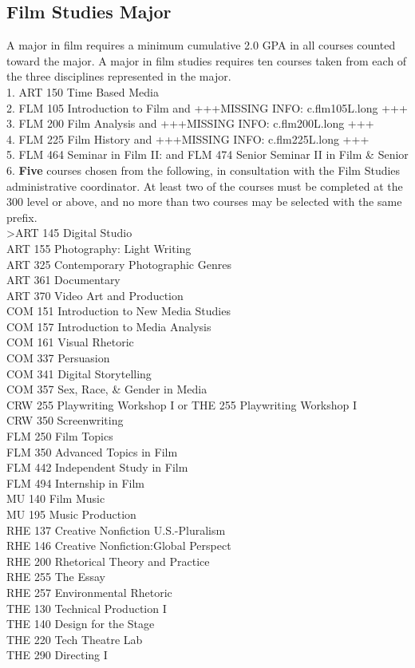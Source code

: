 \documentclass[
  letterpaper,
]{scrbook}
\begin{document}
\subsection{Film Studies Major}\label{film-studies-major}

A major in film requires a minimum cumulative 2.0 GPA in all courses
counted toward the major. A major in film studies requires ten courses
taken from each of the three disciplines represented in the major.\\
1. ART 150 Time Based Media\\
2. FLM 105 Introduction to Film and +++MISSING INFO: c.flm105L.long
+++\\
3. FLM 200 Film Analysis and +++MISSING INFO: c.flm200L.long +++\\
4. FLM 225 Film History and +++MISSING INFO: c.flm225L.long +++\\
5. FLM 464 Seminar in Film II: and FLM 474 Senior Seminar II in Film \&
Senior\\
6. \textbf{Five} courses chosen from the following, in consultation with
the Film Studies administrative coordinator. At least two of the courses
must be completed at the 300 level or above, and no more than two
courses may be selected with the same prefix.\\
\textgreater ART 145 Digital Studio\\
ART 155 Photography: Light Writing\\
ART 325 Contemporary Photographic Genres\\
ART 361 Documentary\\
ART 370 Video Art and Production\\
COM 151 Introduction to New Media Studies\\
COM 157 Introduction to Media Analysis\\
COM 161 Visual Rhetoric\\
COM 337 Persuasion\\
COM 341 Digital Storytelling\\
COM 357 Sex, Race, \& Gender in Media\\
CRW 255 Playwriting Workshop I or THE 255 Playwriting Workshop I\\
CRW 350 Screenwriting\\
FLM 250 Film Topics\\
FLM 350 Advanced Topics in Film\\
FLM 442 Independent Study in Film\\
FLM 494 Internship in Film\\
MU 140 Film Music\\
MU 195 Music Production\\
RHE 137 Creative Nonfiction U.S.-Pluralism\\
RHE 146 Creative Nonfiction:Global Perspect\\
RHE 200 Rhetorical Theory and Practice\\
RHE 255 The Essay\\
RHE 257 Environmental Rhetoric\\
THE 130 Technical Production I\\
THE 140 Design for the Stage\\
THE 220 Tech Theatre Lab\\
THE 290 Directing I
\end{document}
